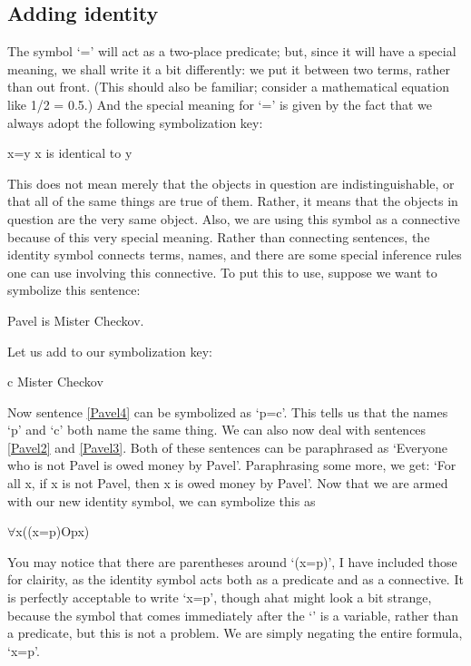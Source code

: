\subsection{
Adding identity
}
The symbol ‘=’ will act as a two-place predicate; but, since it will have a special meaning, we shall write it a bit differently: we put it between two terms, rather than out front. (This should also be familiar; consider a mathematical equation like 1/2 = 0.5.) And the special meaning for ‘=’ is given by the fact that we always adopt the following symbolization key:
\begin{ekey}
\item[x=y] x is identical to y
\end{ekey}
This does not mean merely that the objects in question are indistinguishable, or that all of the same things are true of them. Rather, it means that the objects in question are the very same object. Also, we are using this symbol as a connective because of this very special meaning. Rather than connecting sentences, the identity symbol connects terms, names, and there are some special inference rules one can use involving this connective. To put this to use, suppose we want to symbolize this sentence:
\begin{earg}
\item[\ex{Pavel4}] Pavel is Mister Checkov.
\end{earg}
Let us add to our symbolization key:
\begin{ekey}
\item[c] Mister Checkov
\end{ekey}
Now sentence \ref{Pavel4} can be symbolized as ‘p=c’. This tells us that the names ‘p’ and ‘c’ both name the same thing. We can also now deal with sentences \ref{Pavel2} and \ref{Pavel3}. Both of these sentences can be paraphrased as ‘Everyone who is not Pavel is owed money by Pavel’. Paraphrasing some more, we get: ‘For all x, if x is not Pavel, then x is owed money by Pavel’. Now that we are armed with our new identity symbol, we can symbolize this as
\begin{center}
$\forall$x(\enot (x=p)\eif Opx)
\end{center}
You may notice that there are parentheses around ‘\enot (x=p)’, I have included those for clairity, as the identity symbol acts both as a predicate and as a connective. It is perfectly acceptable to write ‘\enot x=p’, though ahat might look a bit strange, because the symbol that comes immediately after the ‘\enot’ is a variable, rather than a predicate, but this is not a problem. We are simply negating the entire formula, ‘x=p’.
